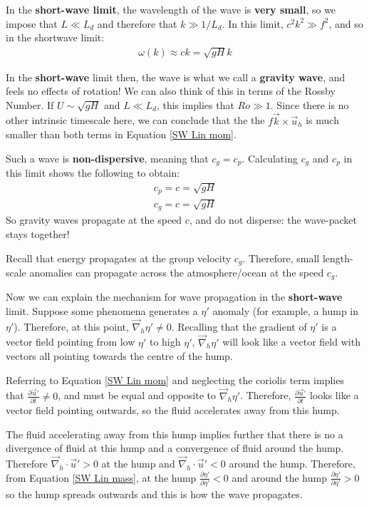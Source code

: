 In the \textbf{short-wave limit}, the wavelength of the wave is \textbf{very small}, so we impose that $L\ll L_d$ and therefore that $k \gg 1/L_d$. In this limit, $c^2k^2\gg f^2$, and so in the shortwave limit:
\begin{align*}
    \boxed{\omega(k)\approx ck = \sqrt{gH}k}
\end{align*} 

In the \textbf{short-wave} limit then, the wave is what we call a \textbf{gravity wave}, and feels no effects of rotation! We can also think of this in terms of the Rossby Number. If $U\sim\sqrt{g H}$ and $L\ll L_d$, this implies that $Ro\gg 1$. Since there is no other intrinsic timescale here, we can conclude that the the $f\vec{k}\times\vec{u}_h$ is much smaller than both terms in Equation \ref{SW Lin mom}.

Such a wave is \textbf{non-dispersive}, meaning that $c_g=c_p$. Calculating $c_g$ and $c_p$ in this limit shows the following to obtain:
\begin{align*}
    c_p = c=\sqrt{gH}\\
    c_g = c=\sqrt{gH}
\end{align*}
So gravity waves propagate at the speed $c$, and do not disperse: the wave-packet stays together!

Recall that energy propagates at the group velocity $c_g$. Therefore, small length-scale anomalies can propagate across the atmosphere/ocean at the speed $c_g$. 

Now we can explain the mechanism for wave propagation in the \textbf{short-wave} limit. Suppose some phenomena generates a $\eta'$ anomaly (for example, a hump in $\eta'$). Therefore, at this point, $\vec{\nabla}_h \eta'\neq 0$. Recalling that the gradient of $\eta'$ is a vector field pointing from low $\eta'$ to high $\eta'$, $\vec{\nabla}_h \eta'$ will look like a vector field with vectors all pointing towards the centre of the hump.

Referring to Equation \ref{SW Lin mom} and neglecting the coriolis term implies that $\frac{\partial \vec{u}'}{\partial t}\neq 0$, and must be equal and opposite to $\vec{\nabla}_h \eta'$. Therefore, $\frac{\partial \vec{u}'}{\partial t}$ looks like a vector field pointing outwards, so the fluid accelerates away from this hump.

The fluid accelerating away from this hump implies further that there is no a divergence of fluid at this hump and a convergence of fluid around the hump. Therefore $\vec{\nabla}_h\cdot\vec{u}'>0$ at the hump and $\vec{\nabla}_h\cdot\vec{u}'<0$ around the hump. Therefore, from Equation \ref{SW Lin mass}, at the hump $\frac{\partial \eta'}{\partial \eta'}<0$ and around the hump $\frac{\partial \eta'}{\partial \eta'}>0$ so the hump spreads outwards and this is how the wave propagates.

